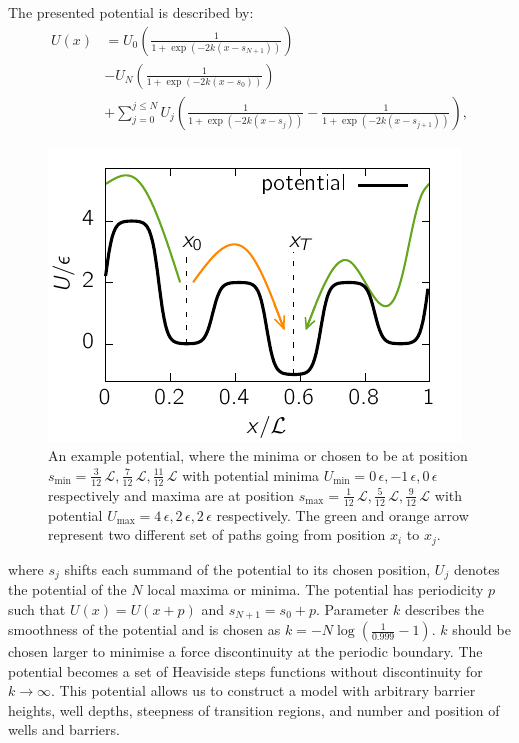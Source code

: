 The presented potential is described by:
\begin{equation}
  \begin{aligned}
  U(x) &=U_0 \left ( \frac{1}{1+\exp(-2k (x-s_{N+1}))} \right ) \\&-  U_N \left ( \frac{1}{1+\exp(-2k (x-s_{0}))} \right ) \\&+ \sum_{j=0}^{j \leq N}  U_j  \left ( \frac{1}{1+ \exp ( -2k (x - s_j  ))}  - \frac{1}{1+ \exp ( -2k (x - s_{j+1}  ))}  \right ) ,
  \end{aligned}
\end{equation}\begin{figure}[t]
\centering
 \includegraphics{../plots/Jaynes/potential_traj.pdf}
\caption[An example potential for a driven particle with periodic boundary conditions.]{An example potential, where the minima or chosen to be at position $s_{\textrm{min}}=\frac{3}{12}\,\mathcal{L}, \frac{7}{12}\,\mathcal{L}, \frac{11}{12}\,\mathcal{L}$ with potential minima  $U_{\textrm{min}}= 0\,\epsilon,-1\,\epsilon,0\,\epsilon$ respectively and maxima are at position $s_{\textrm{max}}=\frac{1}{12}\,\mathcal{L}, \frac{5}{12}\,\mathcal{L}, \frac{9}{12}\,\mathcal{L}$ with potential $U_{\textrm{max}}= 4\,\epsilon,2\,\epsilon,2\,\epsilon$ respectively. The green and orange arrow represent two different set of paths going from position $x_i$ to $x_j$. }
\label{fig:potential1D}
\end{figure}where $s_j$ shifts each summand of the potential to its chosen
position, $U_j$ denotes the potential of the $N$ local maxima or minima.
The potential has periodicity $p$ such that $U(x) = U(x+p)$
and $s_{N+1} = s_0 + p$. Parameter $k$ describes the smoothness of the
potential and is chosen as $k = -N \log \left( \frac{1}{0.999} -1
\right)$. $k$ should be chosen larger to minimise a force discontinuity at the periodic boundary. The potential becomes a set of Heaviside steps functions without discontinuity for $k \to \infty$. This potential allows us to construct a model with arbitrary barrier
heights, well depths, steepness of transition regions, and number and position
of wells and barriers. 
  
